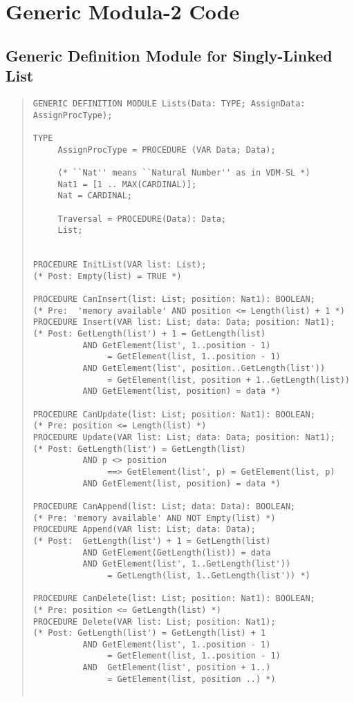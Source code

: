 \section{Generic Modula-2 Code}
\subsection{Generic Definition Module for Singly-Linked List}
\begin{quote}
\begin{verbatim}
GENERIC DEFINITION MODULE Lists(Data: TYPE; AssignData: AssignProcType);

TYPE
     AssignProcType = PROCEDURE (VAR Data; Data);

     (* ``Nat'' means ``Natural Number'' as in VDM-SL *)
     Nat1 = [1 .. MAX(CARDINAL)];
     Nat = CARDINAL;
     
     Traversal = PROCEDURE(Data): Data;
     List;
  
     
PROCEDURE InitList(VAR list: List);
(* Post: Empty(list) = TRUE *)
     
PROCEDURE CanInsert(list: List; position: Nat1): BOOLEAN; 
(* Pre:  'memory available' AND position <= Length(list) + 1 *)
PROCEDURE Insert(VAR list: List; data: Data; position: Nat1);
(* Post: GetLength(list') + 1 = GetLength(list) 
          AND GetElement(list', 1..position - 1) 
               = GetElement(list, 1..position - 1)
          AND GetElement(list', position..GetLength(list')) 
               = GetElement(list, position + 1..GetLength(list))
          AND GetElement(list, position) = data *)

PROCEDURE CanUpdate(list: List; position: Nat1): BOOLEAN;
(* Pre: position <= Length(list) *)
PROCEDURE Update(VAR list: List; data: Data; position: Nat1);
(* Post: GetLength(list') = GetLength(list) 
          AND p <> position 
               ==> GetElement(list', p) = GetElement(list, p) 
          AND GetElement(list, position) = data *)

PROCEDURE CanAppend(list: List; data: Data): BOOLEAN;
(* Pre: 'memory available' AND NOT Empty(list) *)
PROCEDURE Append(VAR list: List; data: Data);
(* Post:  GetLength(list') + 1 = GetLength(list) 
          AND GetElement(GetLength(list)) = data 
          AND GetElement(list', 1..GetLength(list')) 
               = GetLength(list, 1..GetLength(list')) *)

PROCEDURE CanDelete(list: List; position: Nat1): BOOLEAN;
(* Pre: position <= GetLength(list) *)
PROCEDURE Delete(VAR list: List; position: Nat1);
(* Post: GetLength(list') = GetLength(list) + 1  
          AND GetElement(list', 1..position - 1) 
               = GetElement(list, 1..position - 1)
          AND  GetElement(list', position + 1..) 
               = GetElement(list, position ..) *)
 

\end{verbatim}
\end{quote}
